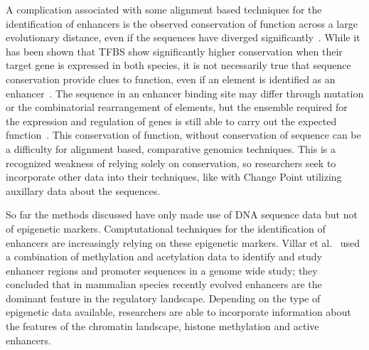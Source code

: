          A complication associated with some alignment based techniques for the identification of enhancers is the observed conservation of function across a large evolutionary distance, even if the sequences have diverged significantly~\cite{tautz2000evolution, pennacchio2013enhancers}. While it has been shown that TFBS show significantly higher conservation when their target gene is expressed in both species, it is not necessarily true that sequence conservation provide clues to function, even if an element is identified as an enhancer~\cite{hemberg2011conservation, pennacchio2013enhancers}.
         The sequence in an enhancer binding site may differ through mutation or the combinatorial rearrangement of elements, but the ensemble required for the expression and regulation of genes is still able to carry out the expected function~\cite{wong2014decoupling}. This conservation of function, without conservation of sequence can be a difficulty for alignment based, comparative genomics techniques. This is a recognized weakness of relying solely on conservation, so researchers seek to incorporate other data into their techniques, like with Change Point utilizing auxillary data about the sequences. 

        

        So far the methods discussed have only made use of DNA sequence data but not of epigenetic markers. 
        Comptutational techniques for the identification of enhancers are increasingly relying on these epigenetic markers. Villar et al.~\cite{villar2015enhancer} used a combination of methylation and acetylation data to identify and study enhancer regions and promoter sequences in a genome wide study; they concluded that in mammalian species recently evolved enhancers are the dominant feature in the regulatory landscape. Depending on the type of epigenetic data available, researchers are able to incorporate information about the features of the chromatin landscape, histone methylation and active enhancers. 
        
